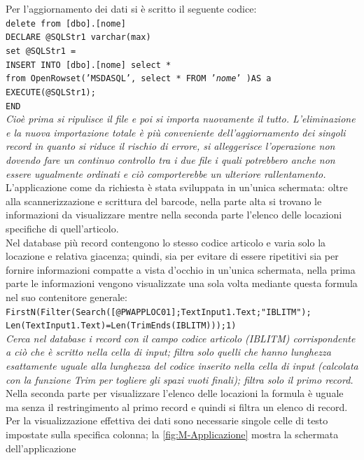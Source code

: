 Per l’aggiornamento dei dati si è scritto il seguente codice:\\
    \texttt{delete from [dbo].[nome]\\
    DECLARE @SQLStr1 varchar(max)\\
    set @SQLStr1 =\\
    INSERT INTO [dbo].[nome] select *\\
    from OpenRowset('MSDASQL', select * FROM '\textit{nome}' )AS a\\
    EXECUTE(@SQLStr1);\\
    END}\\
\textit{Cioè prima si ripulisce il file e poi si importa nuovamente il tutto. L’eliminazione e la nuova importazione totale è più conveniente dell’aggiornamento dei singoli record in quanto si riduce il rischio di errore, si alleggerisce l’operazione non dovendo fare un continuo controllo tra i due file i quali potrebbero anche non essere ugualmente ordinati e ciò comporterebbe un ulteriore rallentamento.}\\
L’applicazione come da richiesta è stata sviluppata in un’unica schermata: oltre alla scannerizzazione e scrittura del barcode, nella parte alta si trovano le informazioni da visualizzare mentre nella seconda parte l’elenco delle locazioni specifiche di quell’articolo.\\
Nel database più record contengono lo stesso codice articolo e varia solo la locazione e relativa giacenza; quindi, sia per evitare di essere ripetitivi sia per fornire informazioni compatte a vista d’occhio in un’unica schermata, nella prima parte le informazioni vengono visualizzate una sola volta mediante questa formula nel suo contenitore generale:\\
\texttt{FirstN(Filter(Search([@PWAPPLOC01];TextInput1.Text;"IBLITM");\\
        Len(TextInput1.Text)=Len(TrimEnds(IBLITM)));1)
       }\\
\textit{Cerca nel database i record con il campo codice articolo (IBLITM) corrispondente a ciò che è scritto nella cella di input; filtra solo quelli che hanno lunghezza esattamente uguale alla lunghezza del codice inserito nella cella di input (calcolata con la funzione Trim per togliere gli spazi vuoti finali); filtra solo il primo record.}\\
Nella seconda parte per visualizzare l’elenco delle locazioni la formula è uguale ma senza il restringimento al primo record e quindi si filtra un elenco di record. Per la visualizzazione effettiva dei dati sono necessarie singole celle di testo impostate sulla specifica colonna; la \figurename \space \ref*{fig:M-Applicazione} mostra la schermata dell'applicazione
